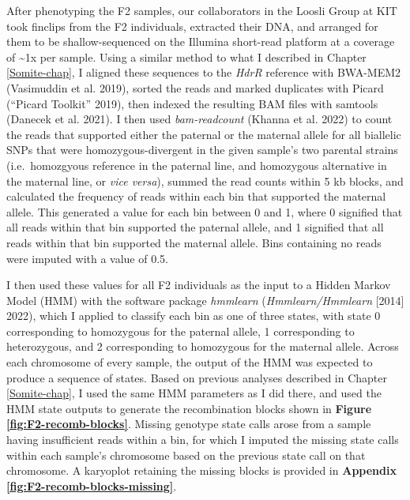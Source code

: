 \documentclass[
]{book}
\begin{document}
After phenotyping the F2 samples, our collaborators in the Loosli Group at KIT took finclips from the F2 individuals, extracted their DNA, and arranged for them to be shallow-sequenced on the Illumina short-read platform at a coverage of \textasciitilde1x per sample. Using a similar method to what I described in Chapter \ref{Somite-chap}, I aligned these sequences to the \emph{HdrR} reference with BWA-MEM2 (Vasimuddin et al. 2019), sorted the reads and marked duplicates with Picard ({``Picard Toolkit''} 2019), then indexed the resulting BAM files with samtools (Danecek et al. 2021). I then used \emph{bam-readcount} (Khanna et al. 2022) to count the reads that supported either the paternal or the maternal allele for all biallelic SNPs that were homozygous-divergent in the given sample's two parental strains (i.e.~homozgyous reference in the paternal line, and homozygous alternative in the maternal line, or \emph{vice versa}), summed the read counts within 5 kb blocks, and calculated the frequency of reads within each bin that supported the maternal allele. This generated a value for each bin between 0 and 1, where 0 signified that all reads within that bin supported the paternal allele, and 1 signified that all reads within that bin supported the maternal allele. Bins containing no reads were imputed with a value of 0.5.

I then used these values for all F2 individuals as the input to a Hidden Markov Model (HMM) with the software package \emph{hmmlearn} (\emph{Hmmlearn/Hmmlearn} {[}2014{]} 2022), which I applied to classify each bin as one of three states, with state 0 corresponding to homozygous for the paternal allele, 1 corresponding to heterozygous, and 2 corresponding to homozygous for the maternal allele. Across each chromosome of every sample, the output of the HMM was expected to produce a sequence of states. Based on previous analyses described in Chapter \ref{Somite-chap}, I used the same HMM parameters as I did there, and used the HMM state outputs to generate the recombination blocks shown in \textbf{Figure \ref{fig:F2-recomb-blocks}}. Missing genotype state calls arose from a sample having insufficient reads within a bin, for which I imputed the missing state calls within each sample's chromosome based on the previous state call on that chromosome. A karyoplot retaining the missing blocks is provided in \textbf{Appendix \ref{fig:F2-recomb-blocks-missing}}.
\end{document}
